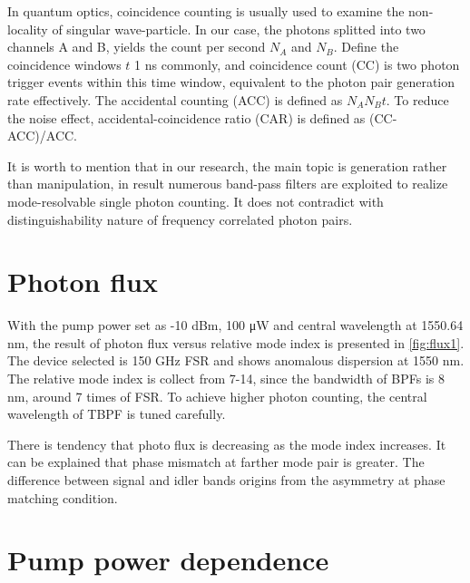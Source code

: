 In quantum optics, coincidence counting is usually used to examine the non-locality of singular wave-particle. In our case, the photons splitted into two channels A and B, yields the count per second $N_A$ and $ N_B $. Define the coincidence windows $t$ 1 ns commonly, and coincidence count (CC) is two photon trigger events within this time window, equivalent to the photon pair generation rate effectively. The accidental counting (ACC) is defined as $ N_A N_B t $. To reduce the noise effect, accidental-coincidence ratio (CAR) is defined as (CC-ACC)/ACC.


It is worth to mention that in our research, the main topic is generation rather than manipulation, in result numerous band-pass filters are exploited to realize mode-resolvable single photon counting. It does not contradict with distinguishability nature of frequency correlated photon pairs.


\section{Photon flux}

With the pump power set as -10 dBm, 100 \si{\micro\watt} and central wavelength at 1550.64 nm, the result of photon flux versus relative mode index is presented in \autoref{fig:flux1}. The device selected is 150 GHz FSR and shows anomalous dispersion at 1550 nm. The relative mode index is collect from 7-14, since the bandwidth of BPFs is 8 nm, around 7 times of FSR. To achieve higher photon counting, the central wavelength of TBPF is tuned carefully.

There is tendency that photo flux is decreasing as the mode index increases. It can be explained that phase mismatch at farther mode pair is greater. The difference between signal and idler bands origins from the asymmetry at phase matching condition. 

\begin{figure}
	\centering
	
	\label{fig:flux1}
\end{figure}




\section{Pump power dependence}

